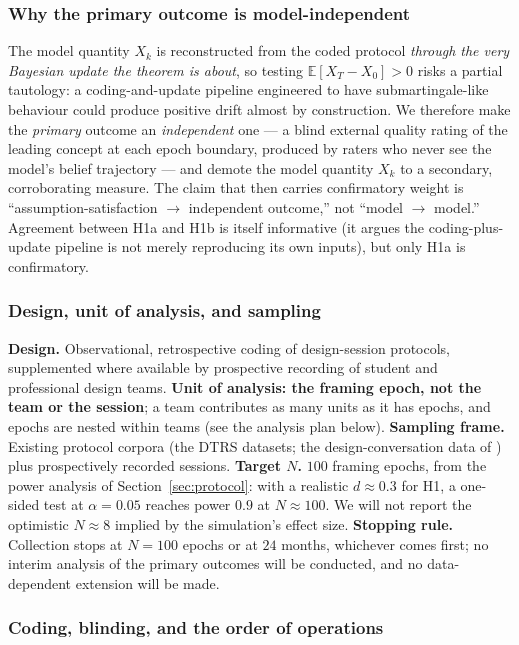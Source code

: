\documentclass[11pt]{article}
\newcommand{\E}{\mathbb{E}}
\begin{document}
\subsubsection*{Why the primary outcome is model-independent}
\label{sec:prereg-independence}
The model quantity $X_k$ is reconstructed from the coded protocol \emph{through the very Bayesian update the theorem is about}, so testing $\E[X_T-X_0]>0$ risks a partial tautology: a coding-and-update pipeline engineered to have submartingale-like behaviour could produce positive drift almost by construction. We therefore make the \emph{primary} outcome an \emph{independent} one --- a blind external quality rating of the leading concept at each epoch boundary, produced by raters who never see the model's belief trajectory --- and demote the model quantity $X_k$ to a secondary, corroborating measure. The claim that then carries confirmatory weight is ``assumption-satisfaction $\rightarrow$ independent outcome,'' not ``model $\rightarrow$ model.'' Agreement between H1a and H1b is itself informative (it argues the coding-plus-update pipeline is not merely reproducing its own inputs), but only H1a is confirmatory.

\subsubsection*{Design, unit of analysis, and sampling}

\textbf{Design.} Observational, retrospective coding of design-session protocols, supplemented where available by prospective recording of student and professional design teams. \textbf{Unit of analysis: the framing epoch, not the team or the session}; a team contributes as many units as it has epochs, and epochs are nested within teams (see the analysis plan below). \textbf{Sampling frame.} Existing protocol corpora (the DTRS datasets; the design-conversation data of \citet{menning2018}) plus prospectively recorded sessions. \textbf{Target $N$.} $100$ framing epochs, from the power analysis of Section~\ref{sec:protocol}: with a realistic $d\approx0.3$ for H1, a one-sided test at $\alpha=0.05$ reaches power $0.9$ at $N\approx100$. We will not report the optimistic $N\approx8$ implied by the simulation's effect size. \textbf{Stopping rule.} Collection stops at $N=100$ epochs or at $24$ months, whichever comes first; no interim analysis of the primary outcomes will be conducted, and no data-dependent extension will be made.

\subsubsection*{Coding, blinding, and the order of operations}
\end{document}
